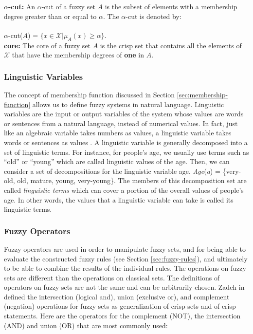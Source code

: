 \documentclass[11pt]{article}
\begin{document}
\textbf{$\alpha$-cut:} An $\alpha$-cut of a fuzzy set $\textit{A}$ is the subset
of elements with a membership degree greater than or equal to $\alpha$. The
$\alpha$-cut is denoted by:\\ \\$\alpha$-cut($\textit{A}$) = $\{\textit{x} \in
\mathcal{X} | \mu_A(\textit{x}) \geqslant \alpha\}$.\\

\textbf{core:} The core of a fuzzy set $\textit{A}$ is the crisp set that
contains all the elements of $\mathcal{X}$ that have the membership degrees of
\textbf{one} in $\textit{A}$.

\subsubsection{Linguistic Variables}
\label{sec:linguistic-variables}

The concept of membership function discussed in Section
\ref{sec:membership-function} allows us to define fuzzy systems in natural
language. Linguistic variables are the input or output variables of the system
whose values are words or sentences from a natural language, instead of
numerical values. In fact, just like an algebraic variable takes numbers as
values, a linguistic variable takes words or sentences as values
\cite{zimmermann:fuzzy-sets}. A linguistic variable is generally decomposed into
a set of linguistic terms. For instance, for people's age, we usually use terms
such as ``old'' or ``young'' which are called linguistic values of the age.
Then, we can consider a set of decompositions for the linguistic variable age,
\textit{Age}(\textit{a}) = \{very-old, old, mature, young, very-young\}. The
members of this decomposition set are called \textit{linguistic terms} which can
cover a portion of the overall values of people's age. In other words, the
values that a linguistic variable can take is called its linguistic terms.

\subsubsection{Fuzzy Operators}

Fuzzy operators are used in order to manipulate fuzzy sets, and for being able
to evaluate the constructed fuzzy rules (see Section \ref{sec:fuzzy-rules}), and
ultimately to be able to combine the results of the individual rules. The
operations on fuzzy sets are different than the operations on classical sets.
The definitions of operators on fuzzy sets are not the same and can be
arbitrarily chosen. Zadeh in \cite{zadeh:fuzzy} defined the intersection
(logical and), union (exclusive or), and complement (negation) operations for
fuzzy sets as generalization of crisp sets and of crisp statements. Here are the
operators for the complement (NOT), the intersection (AND) and union (OR)
that are most commonly used:\\
\end{document}
